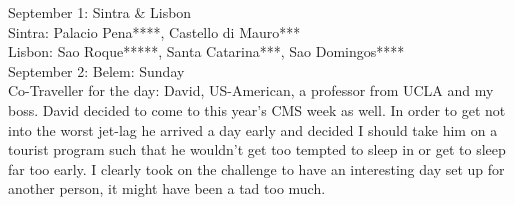 September 1: Sintra \& Lisbon\\
Sintra: Palacio Pena****, Castello di Mauro***\\
Lisbon: Sao Roque*****, Santa Catarina***, Sao Domingos****\\

September 2: Belem: Sunday\\
Co-Traveller for the day: David, US-American, a professor from UCLA and my boss. David decided to come to this year's CMS week as well. In order to get not into the worst jet-lag he arrived a day early and decided I should take him on a tourist program such that he wouldn't get too tempted to sleep in or get to sleep far too early. I clearly took on the challenge to have an interesting day set up for another person, it might have been a tad too much.\\

